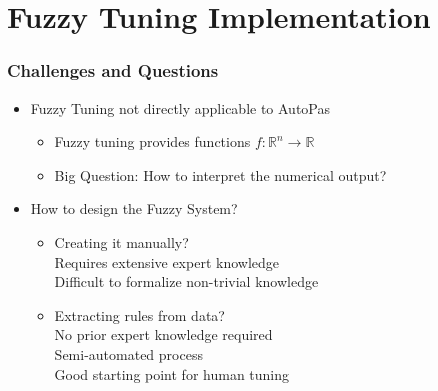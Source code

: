 \documentclass[
	10pt,
	t		%
]{beamer}
\newcommand{\xmark}{\ding{55}}%
\newcommand{\cmark}{\ding{51}}%
\begin{document}
\section{Fuzzy Tuning Implementation}
\begin{frame}
	\frametitle{Challenges and Questions}
	
	\begin{itemize}
		\item Fuzzy Tuning not directly applicable to AutoPas
		      \begin{itemize}
			      \item Fuzzy tuning provides functions $f :\mathbb{R}^n \rightarrow \mathbb{R}$
			      \item Big Question: How to interpret the numerical output?
		      \end{itemize}
		      \pause
		\item How to design the Fuzzy System?
		      \begin{itemize}
			      \item Creating it manually?\\
			            \quad \xmark \; Requires extensive expert knowledge\\
			            \quad \xmark \; Difficult to formalize non-trivial knowledge
			      \item Extracting rules from data?\\
			            \quad \cmark \; No prior expert knowledge required\\
			            \quad \cmark \; Semi-automated process\\
			            \quad \cmark \; Good starting point for human tuning
		      \end{itemize}
	\end{itemize}
\end{frame}
\end{document}
